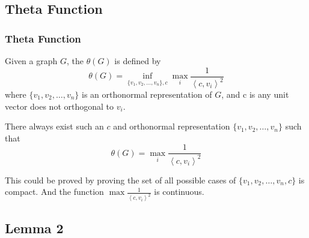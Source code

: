 \documentclass{beamer}
\begin{document}
            \subsection{Theta Function}

                  \begin{frame}
                        \frametitle{Theta Function}
                        Given a graph $ G $, the $ \theta(G) $ is defined by
                        \begin{equation}
                              \theta(G) = \inf_{\{v_1, v_2, \dots, v_n\},c} \max_{i} \frac{1}{\left<c,v_{i}\right>^2}
                        \end{equation}
                        where $ \{v_1, v_2, \dots, v_n\} $ is an orthonormal representation of $ G $, and c is any unit vector does not orthogonal to $ v_i $.

                        \pause

                        \begin{lemma}
                              There always exist such an $c$ and orthonormal representation $ \{v_1, v_2, \dots, v_n\} $ such that
                              \begin{equation}
                                    \theta(G) = \max_{i} \frac{1}{\left<c,v_{i}\right>^2}
                              \end{equation}
                        \end{lemma}

                        This could be proved by proving the set of all possible cases of $ \{v_1, v_2, \dots, v_n,c \} $ is compact. And the function $ \max \frac{1}{\left<c,v_{i}\right>^2} $ is continuous.
                  \end{frame}

            \subsection{Lemma 2}
\end{document}
